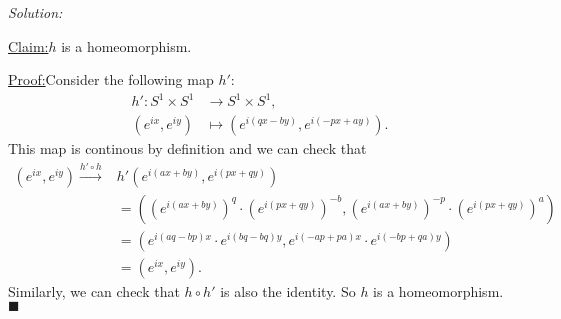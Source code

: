 \documentclass[a4paper, 12pt]{article}
\newenvironment{solution}
    {\textit{Solution:}}
    {}
\newenvironment{claim}[1]{\par\noindent\underline{Claim:}\space#1}{}
\newenvironment{claimproof}[1]{\par\noindent\underline{Proof:}\space#1}{\hfill $\blacksquare$}
\begin{document}
\begin{solution}
\begin{claim}
\(h\) is a homeomorphism.
\end{claim}
\begin{claimproof}
Consider the following map \(h'\):
\begin{align*}
    h':S^1\times S^1&\rightarrow S^1\times S^1,\\ 
    (e^{ix},e^{iy})&\mapsto (e^{i(qx-by)},e^{i(-px+ay)}).
\end{align*}
This map is continous by definition and we can check that 
\begin{align*}
    (e^{ix},e^{iy})\xrightarrow{h'\circ h}&h'(e^{i(ax+by)},e^{i(px+qy)})\\ 
                                          &=((e^{i(ax+by)})^q\cdot (e^{i(px+qy)})^{-b},(e^{i(ax+by)})^{-p}\cdot (e^{i(px+qy)})^a)\\ 
                                          &=(e^{i(aq-bp)x}\cdot e^{i(bq-bq)y}, e^{i(-ap+pa)x}\cdot e^{i(-bp+qa)y})\\ 
                                          &=(e^{ix},e^{iy}).
\end{align*}
Similarly, we can check that \(h\circ h'\) is also the identity. So \(h\) is a homeomorphism.
\end{claimproof}


\end{solution}
\end{document}
